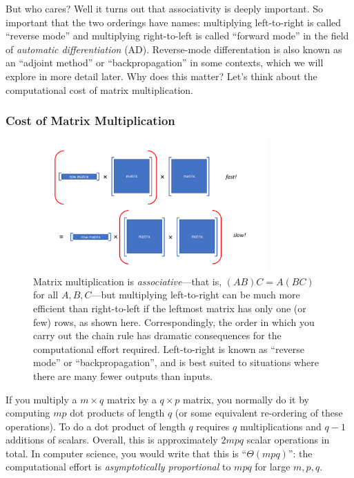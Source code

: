 But who cares? Well it turns out that associativity is deeply important. So important that the two orderings have names: multiplying  left-to-right is called ``reverse mode''  and multiplying right-to-left is called ``forward mode'' in the field of \textit{automatic differentiation} (AD).  Reverse-mode differentation is also known as an ``adjoint method'' or ``backpropagation'' in some contexts, which we will explore in more detail later. Why does this matter? Let's think about the computational cost of matrix multiplication.


\subsubsection{Cost of Matrix Multiplication}
\label{sec:cost-matrix-mult}

\begin{figure}
    \centering
    \includegraphics[width=0.8\textwidth]{figures/matrix-mult-assoc}
    \caption{Matrix multiplication is \emph{associative}---that is, $(AB)C = A(BC)$ for all $A,B,C$---but multiplying left-to-right can be much more efficient than right-to-left if the leftmost matrix has only one (or few) rows, as shown here.  Correspondingly, the order in which you carry out the chain rule has dramatic consequences for the computational effort required.  Left-to-right is known as ``reverse mode'' or ``backpropagation'', and is best suited to situations where there are many fewer outputs than inputs.}
    \label{fig:matrix-mult-assoc}
\end{figure}

If you multiply a $m\times q$ matrix by a $q\times p$ matrix, you normally do it by computing $mp$ dot products of length $q$ (or some equivalent re-ordering of these operations). To do a dot product of length $q$ requires $q$ multiplications and $q-1$ additions of scalars. Overall, this is approximately $2mpq$ scalar operations in total. In computer science, you would write that this is ``$\Theta(mpq)$'': the computational effort is \emph{asymptotically proportional} to $mpq$ for large $m,p,q$.

